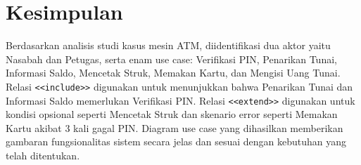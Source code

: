 \documentclass[conference,10pt]{IEEEtran}
\begin{document}
\section{Kesimpulan}

Berdasarkan analisis studi kasus mesin ATM, diidentifikasi dua aktor yaitu Nasabah dan Petugas, serta enam use case: Verifikasi PIN, Penarikan Tunai, Informasi Saldo, Mencetak Struk, Memakan Kartu, dan Mengisi Uang Tunai. Relasi \texttt{<<include>>} digunakan untuk menunjukkan bahwa Penarikan Tunai dan Informasi Saldo memerlukan Verifikasi PIN. Relasi \texttt{<<extend>>} digunakan untuk kondisi opsional seperti Mencetak Struk dan skenario error seperti Memakan Kartu akibat 3 kali gagal PIN. Diagram use case yang dihasilkan memberikan gambaran fungsionalitas sistem secara jelas dan sesuai dengan kebutuhan yang telah ditentukan.
\end{document}
